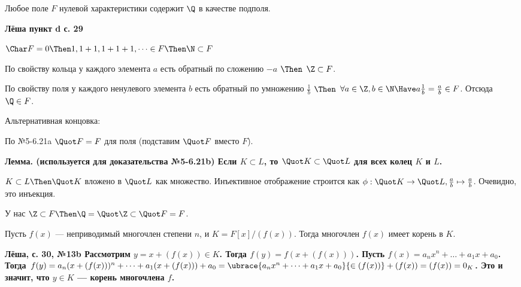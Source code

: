 \begin{problem}
Любое поле $F$ нулевой характеристики содержит $\Q$ в качестве подполя.
\end{problem}
\begin{solution}
\bf{Лёша пункт d с. 29}

$\Char F = 0 \Then 1, 1+1, 1+1+1, \dots \in F \Then \N \subset F$

По свойству кольца у каждого элемента $a$ есть обратный по сложению $-a$ $\Then$ $\Z \subset F$.

По свойству поля у каждого ненулевого элемента $b$ есть обратный по умножению $\frac{1}{b}$ $\Then$ $\forall a\in \Z, b \in \N \Have a \frac{1}{b} = \frac{a}{b} \in F$. Отсюда $\Q \in F$.





Альтернативная концовка:

По №5-6.21a \(\Quot F=F\) для поля (подставим $\Quot F$ вместо $F$).

\bf{Лемма.} (используется для доказательства №5-6.21b) Если \(K \subset L\), то \(\Quot K \subset \Quot L\) для всех колец $K$ и $L$.
\begin{solution}
$K \subset L\Then \Quot K$ вложено в $\Quot L$ как множество. Инъективное отображение строится как $\phi: \Quot K \to \Quot L, \frac{a}{b} \mapsto \frac{a}{b}$. Очевидно, это инъекция.
\end{solution}

У нас \(\Z \subset F \Then \Q=\Quot\Z\subset\Quot F=F\).

\end{solution}

\begin{problem}
Пусть $f(x)$ --- неприводимый многочлен степени $n$, и $K = F[x]/(f(x))$. Тогда многочлен $f(x)$ имеет корень в $K$.
\end{problem}

\begin{solution}
\bf{Лёша, с. 30, №13b}
Рассмотрим $y = x+(f(x)) \in K$. Тогда $f(y) = f(x+(f(x)))$. Пусть $f(x) = a_nx^n+\dots+a_1x+a_0$. Тогда $f(y) = a_n(x+(f(x)))^n+\dots+a_1(x+(f(x)))+a_0 = \ubrace{a_nx^n+\dots+a_1x+a_0}{\in (f(x))}+(f(x)) = (f(x)) = 0_K$. Это и значит, что $y \in K$ --- корень многочлена $f$.
\end{solution}

